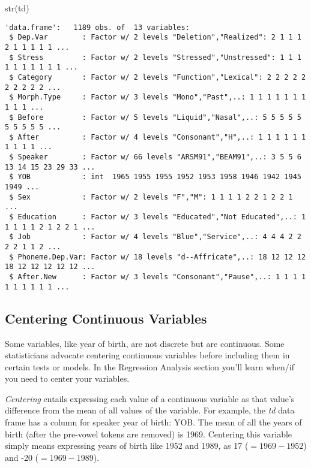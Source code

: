\documentclass[
  12pt,
  letterpaper]{article}
\newenvironment{Shaded}{\begin{snugshade}}{\end{snugshade}}
\newcommand{\FunctionTok}[1]{\textcolor[rgb]{0.28,0.35,0.67}{#1}}
\newcommand{\NormalTok}[1]{\textcolor[rgb]{0.00,0.23,0.31}{#1}}
\renewcommand\texttt[1]{{\ttfamily\color{BrickRed}#1}}
\begin{document}
\begin{Shaded}
\begin{Highlighting}[]
\FunctionTok{str}\NormalTok{(td)}
\end{Highlighting}
\end{Shaded}

\begin{verbatim}
'data.frame':   1189 obs. of  13 variables:
 $ Dep.Var        : Factor w/ 2 levels "Deletion","Realized": 2 1 1 1 2 1 1 1 1 1 ...
 $ Stress         : Factor w/ 2 levels "Stressed","Unstressed": 1 1 1 1 1 1 1 1 1 1 ...
 $ Category       : Factor w/ 2 levels "Function","Lexical": 2 2 2 2 2 2 2 2 2 2 ...
 $ Morph.Type     : Factor w/ 3 levels "Mono","Past",..: 1 1 1 1 1 1 1 1 1 1 ...
 $ Before         : Factor w/ 5 levels "Liquid","Nasal",..: 5 5 5 5 5 5 5 5 5 5 ...
 $ After          : Factor w/ 4 levels "Consonant","H",..: 1 1 1 1 1 1 1 1 1 1 ...
 $ Speaker        : Factor w/ 66 levels "ARSM91","BEAM91",..: 3 5 5 6 13 14 15 23 29 33 ...
 $ YOB            : int  1965 1955 1955 1952 1953 1958 1946 1942 1945 1949 ...
 $ Sex            : Factor w/ 2 levels "F","M": 1 1 1 1 2 2 1 2 2 1 ...
 $ Education      : Factor w/ 3 levels "Educated","Not Educated",..: 1 1 1 1 1 2 1 2 2 1 ...
 $ Job            : Factor w/ 4 levels "Blue","Service",..: 4 4 4 2 2 2 2 1 1 2 ...
 $ Phoneme.Dep.Var: Factor w/ 18 levels "d--Affricate",..: 18 12 12 12 18 12 12 12 12 12 ...
 $ After.New      : Factor w/ 3 levels "Consonant","Pause",..: 1 1 1 1 1 1 1 1 1 1 ...
\end{verbatim}

\hypertarget{centering-continuous-variables}{%
\subsection{Centering Continuous
Variables}\label{centering-continuous-variables}}

Some variables, like year of birth, are not discrete but are continuous.
Some statisticians advocate centering continuous variables before
including them in certain tests or models. In the Regression Analysis
section you'll learn when/if you need to center your variables.

\emph{Centering} entails expressing each value of a continuous variable
as that value's difference from the mean of all values of the variable.
For example, the \emph{td} data frame has a column for speaker year of
birth: \texttt{YOB}. The mean of all the years of birth (after the
pre-vowel tokens are removed) is \texttt{1969}. Centering this variable
simply means expressing years of birth like 1952 and 1989, as 17
(\(=1969-1952\)) and -20 (\(=1969-1989\)).
\end{document}
